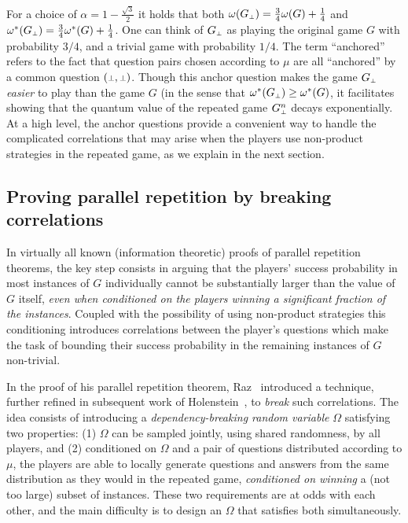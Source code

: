 For a choice of $\alpha = 1 - \frac{\sqrt{3}}{2}$ it holds that both $\val(G_\dummy) = \frac{3}{4} \val(G) + \frac{1}{4}$ and  $\eval(G_\dummy) =\frac{3}{4} \eval(G) + \frac{1}{4}$. One can think of $G_\dummy$ as playing the original game $G$ with probability $3/4$, and a trivial game with probability $1/4$. The term ``anchored'' refers to the fact that question pairs chosen according to $\mu$ are all  ``anchored'' by a common question $(\dummy,\dummy)$. Though this anchor question makes the game $G_\dummy$ \emph{easier} to play than the game $G$ (in the sense that $\eval(G_\dummy) \geq \eval(G)$,  it facilitates showing that the quantum value of the repeated game $G_\dummy^n$ decays exponentially. At a high level, the anchor questions provide a convenient way to handle the complicated correlations that may arise when the players use non-product strategies in the repeated game, as we explain in the next section.

\subsection{Proving parallel repetition by breaking correlations}
In virtually all known (information theoretic) proofs of parallel repetition theorems,  the key step consists in arguing that the players' success probability in most instances of $G$ individually cannot be substantially larger than the value of $G$ itself, \emph{even when conditioned on the players winning a significant fraction of the instances}. Coupled with the possibility of using non-product strategies this conditioning introduces correlations between the player's questions which make the task of bounding their success probability in the remaining instances of $G$ non-trivial.

In the proof of his parallel repetition theorem, Raz~\cite{raz1998parallel} introduced a technique, further refined in subsequent work of Holenstein~\cite{Hol09}, to \emph{break} such correlations. The idea consists of introducing a \emph{dependency-breaking random variable} $\Omega$ satisfying two properties: (1) $\Omega$ can be sampled jointly, using shared randomness, by all players, and (2) conditioned on $\Omega$ and a pair of questions distributed according to $\mu$, the players are able to locally generate questions and answers from the same distribution as they would in the repeated game, \emph{conditioned on winning} a (not too large) subset of instances. These two requirements are at odds with each other, and the main difficulty is to design an $\Omega$ that satisfies both simultaneously. 

